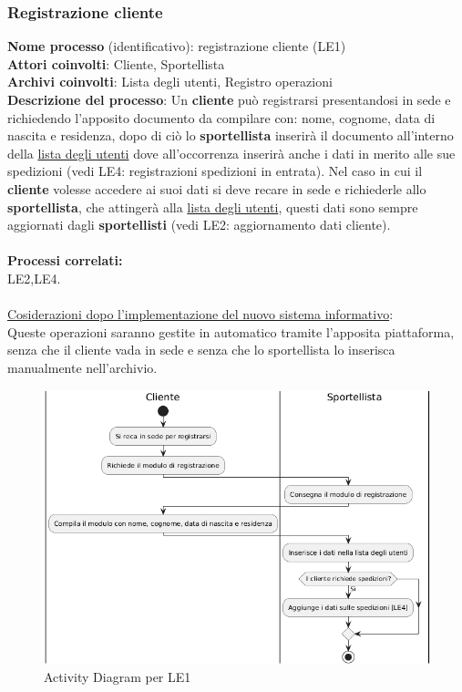 \documentclass[a4paper,12pt]{article}
\begin{document}
\subsubsection{Registrazione cliente}
\textbf{Nome processo} (identificativo): registrazione cliente (LE1) \\
\textbf{Attori coinvolti}: Cliente, Sportellista \\
\textbf{Archivi coinvolti}: Lista degli utenti, Registro operazioni \\ 
\textbf{Descrizione del processo}:  Un \textbf{cliente} può registrarsi presentandosi in sede e richiedendo l'apposito documento da compilare con: 
nome, cognome, data di nascita e residenza, dopo di ciò lo \textbf{sportellista} inserirà il documento all'interno della \underline{lista degli utenti} 
dove all'occorrenza inserirà anche i dati in merito alle sue spedizioni (vedi LE4: registrazioni spedizioni in entrata). Nel caso in cui il \textbf{cliente} 
volesse accedere ai suoi dati si deve recare in sede e richiederle allo \textbf{sportellista}, che attingerà alla \underline{lista degli utenti}, questi dati 
sono sempre aggiornati dagli \textbf{sportellisti} (vedi LE2: aggiornamento dati cliente). \\ \\
\textbf{Processi correlati:}\\LE2,LE4.\\ \\
\underline{Cosiderazioni dopo l'implementazione del nuovo sistema informativo}: \\ Queste operazioni saranno gestite in automatico tramite l'apposita piattaforma, 
senza che il cliente vada in sede e senza che lo sportellista lo inserisca manualmente nell'archivio.
\begin{figure}[H]
	\centering
	\includegraphics[width=0.8\linewidth]{assets/activitydiagram_LE1.png}
	\caption{Activity Diagram per LE1}
\end{figure}
\end{document}
